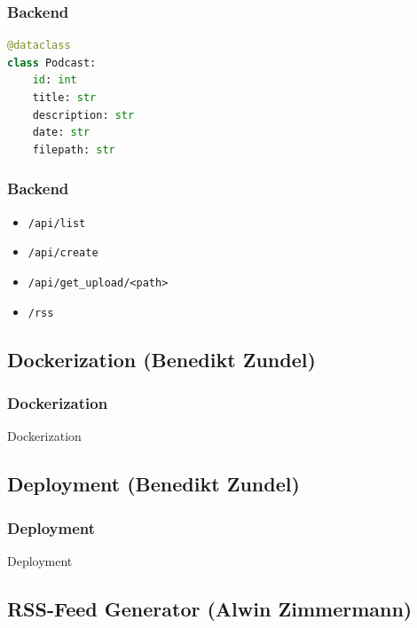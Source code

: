 \documentclass{beamer}
\begin{document}
\begin{frame}[fragile]
\frametitle{Backend}
\begin{lstlisting}[label=lst:episode_model, language=Python, caption=Implementation der Podcast-Episoden Klasse]
@dataclass
class Podcast:
    id: int
    title: str
    description: str
    date: str
    filepath: str
\end{lstlisting}
\end{frame}

\begin{frame}
  \frametitle{Backend}
  \begin{itemize}
    \item \texttt{/api/list}
    \item \texttt{/api/create}
    \item \texttt{/api/get\_upload/<path>}
    \item \texttt{/rss}
  \end{itemize}
\end{frame}

\subsection{Dockerization \small{(Benedikt Zundel)}}
\begin{frame}
\frametitle{Dockerization}
\begin{center}
  \huge Dockerization
\end{center}
\end{frame}

\subsection{Deployment \small{(Benedikt Zundel)}}
\begin{frame}
\frametitle{Deployment}
\begin{center}
  \huge Deployment
\end{center}
\end{frame}

\subsection{RSS-Feed Generator \small{(Alwin Zimmermann)}}
\end{document}
